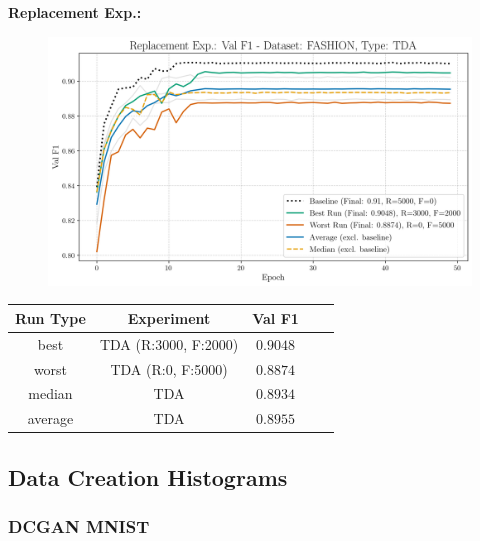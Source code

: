 \noindent\textbf{Replacement Exp.:}
\begin{figure}[htbp]
	\centering
	\includegraphics[width=.85\textwidth]{abb/strat_classifier_performance/tda_fashion_mnist/replacement_experiments/val_f1_score_tda_fashion_mnist_fashion_all.png}
	\label{fig:app_strat_class_performance_replacement_exp._val_f1_score_}
\end{figure}
\begin{table}[H]
	\centering
	\vspace{-1em}
	\begin{tabular}{|c|c|c|c|c|}
		\hline
		Run Type & Experiment & Val F1 \\ \hline
		best & TDA (R:3000, F:2000) & $0.9048$\\ \hline
		worst & TDA (R:0, F:5000) & $0.8874$\\ \hline
		median & TDA & $0.8934$\\ \hline
		average & TDA & $0.8955$
		\\ \hline
	\end{tabular}
\end{table}
\newpage

\subsection{Data Creation Histograms}
\subsubsection{DCGAN MNIST}

